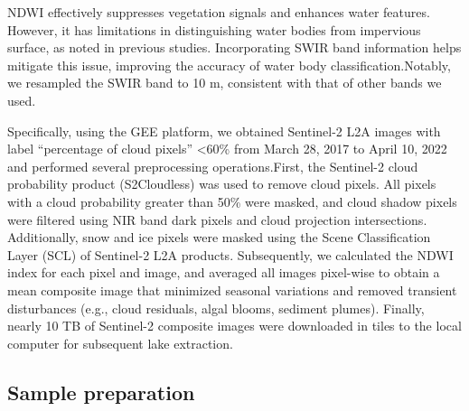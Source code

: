 \documentclass[preprint,12pt,authoryear]{elsarticle}
\begin{document}
NDWI effectively suppresses vegetation signals and enhances water features. However, it has limitations in distinguishing water bodies from impervious surface, as noted in previous studies. Incorporating SWIR band information helps mitigate this issue, improving the accuracy of water body classification.Notably, we resampled the SWIR band to 10 m, consistent with that of other bands we used.

Specifically, using the GEE platform, we obtained Sentinel-2 L2A images with label “percentage of cloud pixels” <60\% from March 28, 2017 to April 10, 2022 and performed several preprocessing operations.First, the Sentinel-2 cloud probability product (S2Cloudless) was used to remove cloud pixels. All pixels with a cloud probability greater than 50\% were masked, and cloud shadow pixels were filtered using NIR band dark pixels and cloud projection intersections. Additionally, snow and ice pixels were masked using the Scene Classification Layer (SCL) of Sentinel-2 L2A products. Subsequently, we calculated the NDWI index for each pixel and image, and averaged all images pixel-wise to obtain a mean composite image that minimized seasonal variations and removed transient disturbances (e.g., cloud residuals, algal blooms, sediment plumes). Finally, nearly 10 TB of Sentinel-2 composite images were downloaded in tiles to the local computer for subsequent lake extraction.

\subsection{Sample preparation}
\label{subsec2}
\end{document}
